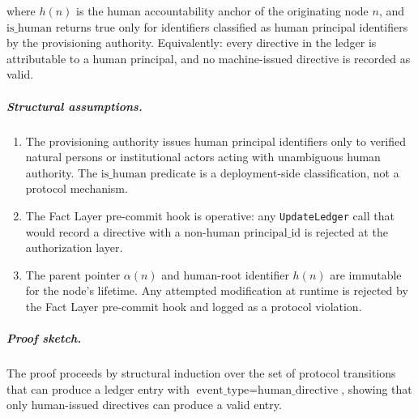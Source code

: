 where $h(n)$ is the human accountability anchor of the originating node $n$, and $\text{is\_human}$ returns true only for identifiers classified as human principal identifiers by the provisioning authority. Equivalently: every directive in the ledger is attributable to a human principal, and no machine-issued directive is recorded as valid.

\subparagraph{Structural assumptions.}
\begin{enumerate}
\item[\textbf{A3.1}] The provisioning authority issues human principal identifiers only to verified natural persons or institutional actors acting with unambiguous human authority. The $\text{is\_human}$ predicate is a deployment-side classification, not a protocol mechanism.
\item[\textbf{A3.2}] The Fact Layer pre-commit hook is operative: any \texttt{UpdateLedger} call that would record a directive with a non-human $\text{principal\_id}$ is rejected at the authorization layer.
\item[\textbf{A3.3}] The parent pointer $\alpha(n)$ and human-root identifier $h(n)$ are immutable for the node's lifetime. Any attempted modification at runtime is rejected by the Fact Layer pre-commit hook and logged as a protocol violation.
\end{enumerate}

\subparagraph{Proof sketch.} The proof proceeds by structural induction over the set of protocol transitions that can produce a ledger entry with $\text{event\_type} = \text{human\_directive}$, showing that only human-issued directives can produce a valid entry.

